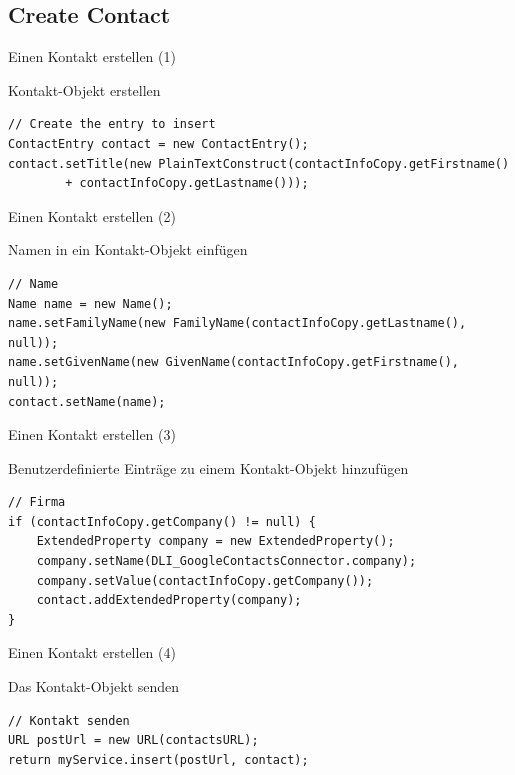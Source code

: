 \subsection{Create Contact}

\begin{frame}[fragile]{Einen Kontakt erstellen (1)}
\begin{block}{Kontakt-Objekt erstellen}
\javalstset
\begin{lstlisting}
// Create the entry to insert
ContactEntry contact = new ContactEntry();
contact.setTitle(new PlainTextConstruct(contactInfoCopy.getFirstname()
		+ contactInfoCopy.getLastname()));
\end{lstlisting}
\end{block}
\end{frame}

\begin{frame}[fragile]{Einen Kontakt erstellen (2)}
\begin{block}{Namen in ein Kontakt-Objekt einfügen}
\javalstset
\begin{lstlisting}
// Name
Name name = new Name();
name.setFamilyName(new FamilyName(contactInfoCopy.getLastname(), null));
name.setGivenName(new GivenName(contactInfoCopy.getFirstname(), null));
contact.setName(name);
\end{lstlisting}
\end{block}
\end{frame}

\begin{frame}[fragile]{Einen Kontakt erstellen (3)}
\begin{block}{Benutzerdefinierte Einträge zu einem Kontakt-Objekt hinzufügen}
\javalstset
\begin{lstlisting}	
// Firma
if (contactInfoCopy.getCompany() != null) {
	ExtendedProperty company = new ExtendedProperty();
	company.setName(DLI_GoogleContactsConnector.company);
	company.setValue(contactInfoCopy.getCompany());
	contact.addExtendedProperty(company);
}
\end{lstlisting}
\end{block}
\end{frame}

\begin{frame}[fragile]{Einen Kontakt erstellen (4)}
\begin{block}{Das Kontakt-Objekt senden}
\javalstset
\begin{lstlisting}
// Kontakt senden		
URL postUrl = new URL(contactsURL);
return myService.insert(postUrl, contact);
\end{lstlisting}
\end{block}
\end{frame}

